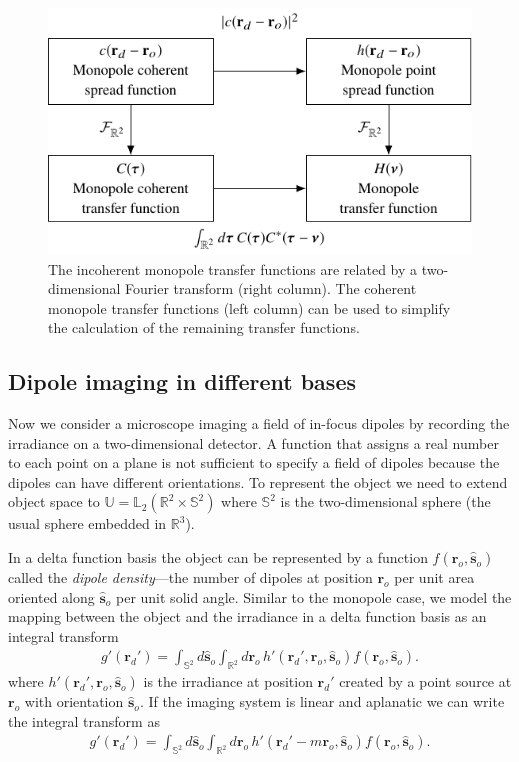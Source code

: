 \documentclass[]{osa-article}
\providecommand{\ro}{\mathbf{\mathbf{r}}_o}
\providecommand{\so}{\mathbf{\hat{s}}_o}
\providecommand{\rd}{\mathbf{r}_d}
\providecommand{\mbb}[1]{\mathbb{#1}}
\begin{document}
\begin{figure}
  \centering
  \includegraphics[scale=1.0]{../figures/monopole-transfer-functions/monopole-transfer-functions.pdf}
  \caption{The incoherent monopole transfer functions are related by a
    two-dimensional Fourier transform (right column). The coherent monopole
    transfer functions (left column) can be used to simplify the calculation of
    the remaining transfer functions.}
   \label{fig:monopole-transfer-functions}
 \end{figure}

\subsection{Dipole imaging in different bases}\label{sec:dipole}
Now we consider a microscope imaging a field of in-focus dipoles by recording
the irradiance on a two-dimensional detector. A function that assigns a real
number to each point on a plane is not sufficient to specify a field of dipoles
because the dipoles can have different orientations. To represent the object we
need to extend object space to $\mbb{U} = \mbb{L}_2(\mbb{R}^2\times\mbb{S}^2)$
where $\mbb{S}^2$ is the two-dimensional sphere (the usual sphere embedded in
$\mbb{R}^3$).

In a delta function basis the object can be represented by a function
$f(\ro, \so)$ called the \textit{dipole density}---the number of dipoles at
position $\ro{}$ per unit area oriented along $\so{}$ per unit solid angle.
Similar to the monopole case, we model the mapping between the object and the
irradiance in a delta function basis as an integral transform
\begin{align}
  g'(\rd') = \int_{\mbb{S}^2}d\so\int_{\mbb{R}^2}d\ro\, h'(\rd', \ro, \so)f(\ro, \so). 
\end{align}
where $h'(\rd', \ro, \so)$ is the irradiance at position $\rd'$ created by a
point source at $\ro$ with orientation $\so$. If the imaging system is
linear and aplanatic we can write the integral transform as
\begin{align}
  g'(\rd') = \int_{\mbb{S}^2}d\so\int_{\mbb{R}^2}d\ro\, h'(\rd' - m\ro, \so)f(\ro, \so). 
\end{align}
\end{document}
